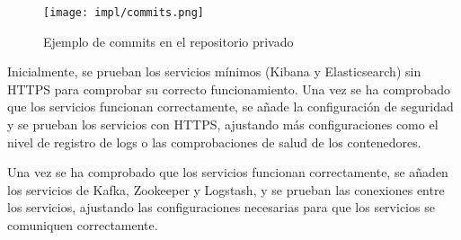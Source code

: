 \begin{figure}[H]
  \centering
  \texttt{[image: impl/commits.png]}
  \caption{Ejemplo de commits en el repositorio privado}
  \label{fig:commits}
\end{figure}

Inicialmente, se prueban los servicios mínimos (Kibana y Elasticsearch) sin
HTTPS para comprobar su correcto funcionamiento. Una vez se ha comprobado que
los servicios funcionan correctamente, se añade la configuración de seguridad
y se prueban los servicios con HTTPS, ajustando más configuraciones como el
nivel de registro de logs o las comprobaciones de salud de los contenedores.

Una vez se ha comprobado que los servicios funcionan correctamente, se añaden
los servicios de Kafka, Zookeeper y Logstash, y se prueban las conexiones entre
los servicios, ajustando las configuraciones necesarias para que los servicios
se comuniquen correctamente.
